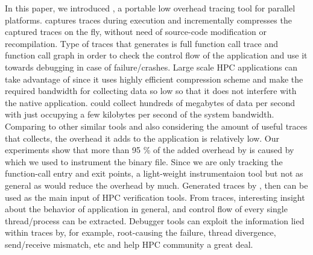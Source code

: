 

In this paper, we introduced \parlot, a portable low overhead tracing tool for parallel platforms. \parlot captures traces during execution and incrementally compresses the captured traces on the fly, without need of source-code modification or recompilation. 
Type of traces that \parlot generates is full function call trace and function call graph in order to check the control flow of the application and use it towards debugging in case of failure/crashes. Large scale HPC applications can take advantage of \parlot since it uses highly efficient compression scheme and make the required bandwidth for collecting data so low so that it does not interfere with the native application. \parlot could collect hundreds of megabytes of data per second with just occupying a few kilobytes per second of the system bandwidth. Comparing to other similar tools and also considering the amount of useful traces that \parlot collects, the overhead it adds to the application is relatively low.
Our experiments show that more than 95 \% of the added overhead by \parlot is caused by \pin which we used to instrument the binary file. Since we are only tracking the function-call entry and exit points, a light-weight instrumentaion tool but not as general as \pin would reduce the overhead by much.
Generated traces by \parlot, then can be used as the main input of HPC verification tools. From \parlot traces, interesting insight about the behavior of application in general, and control flow of every single thread/process can be extracted. Debugger tools can exploit the information lied within \parlot traces by, for example, root-causing the failure, thread divergence, send/receive mismatch, etc and help HPC community a great deal. 

